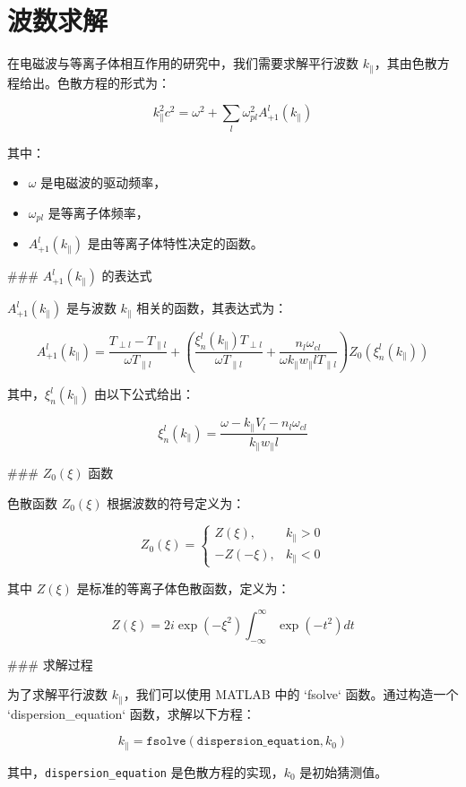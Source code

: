 \documentclass{article}
\begin{document}
\section*{波数求解}

在电磁波与等离子体相互作用的研究中，我们需要求解平行波数 \( k_\parallel \)，其由色散方程给出。色散方程的形式为：

\[
k_\parallel^2 c^2 = \omega^2 + \sum_l \omega_{pl}^2 A_{+1}^l(k_\parallel)
\]

其中：
\begin{itemize}
  \item \( \omega \) 是电磁波的驱动频率，
  \item \( \omega_{pl} \) 是等离子体频率，
  \item \( A_{+1}^l(k_\parallel) \) 是由等离子体特性决定的函数。
\end{itemize}

### \( A_{+1}^l(k_\parallel) \) 的表达式

\( A_{+1}^l(k_\parallel) \) 是与波数 \( k_\parallel \) 相关的函数，其表达式为：

\[
A_{+1}^l(k_\parallel) = \frac{T_{\perp l} - T_{\parallel l}}{\omega T_{\parallel l}} + \left( \frac{\xi_n^l(k_\parallel) T_{\perp l}}{\omega T_{\parallel l}} + \frac{n_l \omega_{cl}}{\omega k_\parallel w_\parallel l T_{\parallel l}} \right) Z_0\left( \xi_n^l(k_\parallel) \right)
\]

其中，\( \xi_n^l(k_\parallel) \) 由以下公式给出：

\[
\xi_n^l(k_\parallel) = \frac{\omega - k_\parallel V_l - n_l \omega_{cl}}{k_\parallel w_\parallel l}
\]

### \( Z_0(\xi) \) 函数

色散函数 \( Z_0(\xi) \) 根据波数的符号定义为：

\[
Z_0(\xi) = \begin{cases}
Z(\xi), & k_\parallel > 0 \\
-Z(-\xi), & k_\parallel < 0
\end{cases}
\]

其中 \( Z(\xi) \) 是标准的等离子体色散函数，定义为：

\[
Z(\xi) = 2i \exp(-\xi^2) \int_{-\infty}^{\infty} \exp(-t^2) dt
\]

### 求解过程

为了求解平行波数 \( k_\parallel \)，我们可以使用 MATLAB 中的 `fsolve` 函数。通过构造一个 `dispersion_equation` 函数，求解以下方程：

\[
k_\parallel = \texttt{fsolve}(\texttt{dispersion\_equation}, k_0)
\]

其中，\texttt{dispersion\_equation} 是色散方程的实现，\( k_0 \) 是初始猜测值。
\end{document}
